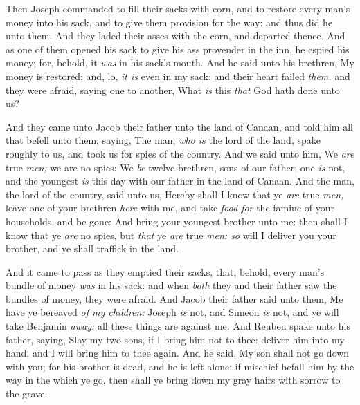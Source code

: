 \documentclass[11pt,letterpaper,oneside]{memoir}
\begin{document}
Then Joseph commanded to fill their sacks with corn, and to restore
every man's money into his sack, and to give them provision for the way:
and thus did he unto them. And they laded their asses with the corn, and
departed thence. And as one of them opened his sack to give his ass
provender in the inn, he espied his money; for, behold, it \emph{was} in
his sack's mouth. And he said unto his brethren, My money is restored;
and, lo, \emph{it is} even in my sack: and their heart failed
\emph{them,} and they were afraid, saying one to another, What \emph{is}
this \emph{that} God hath done unto us?

And they came unto Jacob their father unto the land of Canaan, and told
him all that befell unto them; saying, The man, \emph{who is} the lord
of the land, spake roughly to us, and took us for spies of the country.
And we said unto him, We \emph{are} true \emph{men;} we are no spies: We
\emph{be} twelve brethren, sons of our father; one \emph{is} not, and
the youngest \emph{is} this day with our father in the land of Canaan.
And the man, the lord of the country, said unto us, Hereby shall I know
that ye \emph{are} true \emph{men;} leave one of your brethren
\emph{here} with me, and take \emph{food for} the famine of your
households, and be gone: And bring your youngest brother unto me: then
shall I know that ye \emph{are} no spies, but \emph{that} ye \emph{are}
true \emph{men: so} will I deliver you your brother, and ye shall
traffick in the land.

And it came to pass as they emptied their sacks, that, behold, every
man's bundle of money \emph{was} in his sack: and when \emph{both} they
and their father saw the bundles of money, they were afraid. And Jacob
their father said unto them, Me have ye bereaved \emph{of my children:}
Joseph \emph{is} not, and Simeon \emph{is} not, and ye will take
Benjamin \emph{away:} all these things are against me. And Reuben spake
unto his father, saying, Slay my two sons, if I bring him not to thee:
deliver him into my hand, and I will bring him to thee again. And he
said, My son shall not go down with you; for his brother is dead, and he
is left alone: if mischief befall him by the way in the which ye go,
then shall ye bring down my gray hairs with sorrow to the grave.
\end{document}
